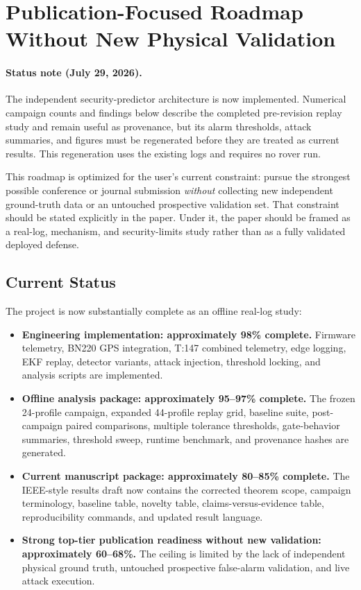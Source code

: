 \section{Publication-Focused Roadmap Without New Physical Validation}
\label{sec:roadmap}

\paragraph{Status note (July 29, 2026).}
The independent security-predictor architecture is now implemented. Numerical
campaign counts and findings below describe the completed pre-revision replay
study and remain useful as provenance, but its alarm thresholds, attack
summaries, and figures must be regenerated before they are treated as current
results. This regeneration uses the existing logs and requires no rover run.

This roadmap is optimized for the user's current constraint: pursue the
strongest possible conference or journal submission \emph{without} collecting
new independent ground-truth data or an untouched prospective validation set.
That constraint should be stated explicitly in the paper. Under it, the paper
should be framed as a real-log, mechanism, and security-limits study rather
than as a fully validated deployed defense.

\subsection{Current Status}

The project is now substantially complete as an offline real-log study:

\begin{itemize}
    \item \textbf{Engineering implementation: approximately 98\% complete.}
    Firmware telemetry, BN220 GPS integration, T:147 combined telemetry, edge
    logging, EKF replay, detector variants, attack injection, threshold
    locking, and analysis scripts are implemented.

    \item \textbf{Offline analysis package: approximately 95--97\% complete.}
    The frozen 24-profile campaign, expanded 44-profile replay grid,
    baseline suite, post-campaign paired comparisons, multiple tolerance
    thresholds, gate-behavior summaries, threshold sweep, runtime benchmark,
    and provenance hashes are generated.

    \item \textbf{Current manuscript package: approximately 80--85\%
    complete.} The IEEE-style results draft now contains the corrected
    theorem scope, campaign terminology, baseline table, novelty table,
    claims-versus-evidence table, reproducibility commands, and updated result
    language.

    \item \textbf{Strong top-tier publication readiness without new
    validation: approximately 60--68\%.} The ceiling is limited by the lack of
    independent physical ground truth, untouched prospective false-alarm
    validation, and live attack execution.
\end{itemize}

